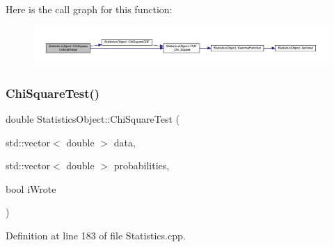 Here is the call graph for this function\+:
\nopagebreak
\begin{figure}[H]
\begin{center}
\leavevmode
\includegraphics[width=350pt]{class_statistics_object_aa4d91e7d45164eb8a3849c1c7df585e1_cgraph}
\end{center}
\end{figure}
\mbox{\label{class_statistics_object_a5f516a6f544714694efc0ba0f925f38c}} 
\subsubsection{\texorpdfstring{Chi\+Square\+Test()}{ChiSquareTest()}\hspace{0.1cm}{\footnotesize\ttfamily [1/2]}}
{\footnotesize\ttfamily double Statistics\+Object\+::\+Chi\+Square\+Test (\begin{DoxyParamCaption}\item[{std\+::vector$<$ double $>$}]{data,  }\item[{std\+::vector$<$ double $>$}]{probabilities,  }\item[{bool}]{i\+Wrote }\end{DoxyParamCaption})}



Definition at line 183 of file Statistics.\+cpp.

